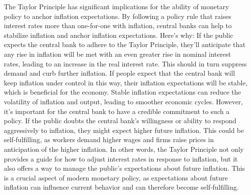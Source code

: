 \begin{enumerate}
The Taylor Principle has significant implications for the ability of monetary policy to anchor inflation expectations.
By following a policy rule that raises interest rates more than one-for-one with inflation,
  central banks can help to stabilize inflation and anchor inflation expectations.
Here's why: If the public expects the central bank to adhere to the Taylor Principle,
  they'll anticipate that any rise in inflation will be met with an even greater rise in nominal interest rates,
  leading to an increase in the real interest rate.
This should in turn suppress demand and curb further inflation.
If people expect that the central bank will keep inflation under control in this way, their inflation expectations will be stable, which is beneficial for the economy.
Stable inflation expectations can reduce the volatility of inflation and output, leading to smoother economic cycles.
However, it's important for the central bank to have a credible commitment to such a policy.
If the public doubts the central bank's willingness or ability to respond aggressively to inflation, they might expect higher future inflation.
This could be self-fulfilling, as workers demand higher wages and firms raise prices in anticipation of the higher inflation.
In other words, the Taylor Principle not only provides a guide for how to adjust interest rates in response to inflation,
  but it also offers a way to manage the public's expectations about future inflation.
This is a crucial aspect of modern monetary policy, as expectations about future inflation can influence current behavior and can therefore become self-fulfilling.
\end{enumerate}